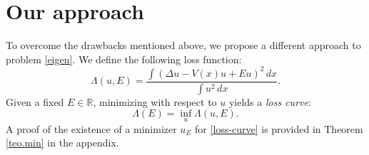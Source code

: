 \documentclass[reprint,superscriptaddress,aps,prl]{revtex4-2}
\newcommand{\R}{\mathbb{R}}
\begin{document}
%
%
%
%

\section{Our approach}

To overcome the drawbacks mentioned above, we propose a different approach to problem \eqref{eigen}. We define the following loss function:
\begin{equation}\label{Lambda}
\Lambda(u, E) = \frac{\int (\Delta u - V(x) u + Eu)^2\, dx}{\int u^2\, dx}.
\end{equation}
Given a fixed $E\in \R$, minimizing with respect to $u$ yields a {\em loss curve}:
\begin{equation}\label{loss-curve}
\Lambda(E) = \inf_u \Lambda(u, E).
\end{equation}
A proof of the existence of a minimizer $u_E$ for \eqref{loss-curve} is provided in Theorem \ref{teo.min} in the appendix.
\end{document}
